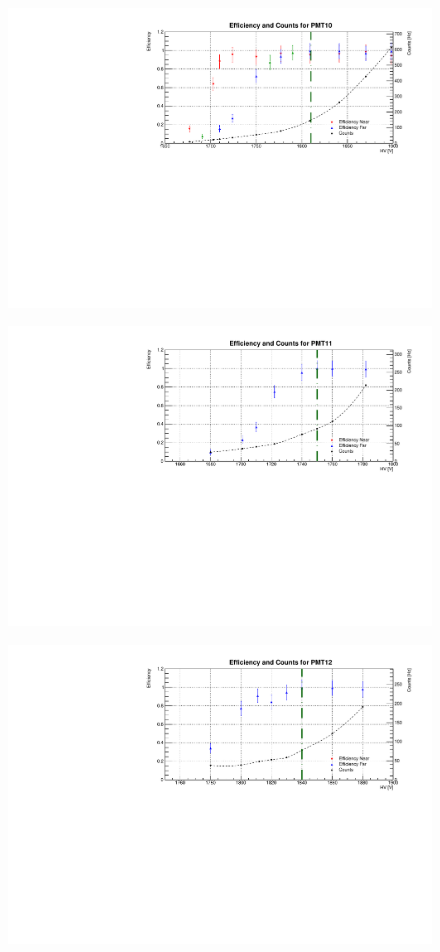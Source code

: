 \begin{figure}[h]
	\centerline{\includegraphics[scale=0.9]{img/eff/eff10.pdf}}
\end{figure}
\begin{figure}[h]
	\centerline{\includegraphics[scale=0.9]{img/eff/eff11.pdf}}
\end{figure}
\begin{figure}[h]
	\centerline{\includegraphics[scale=0.9]{img/eff/eff12.pdf}}
\end{figure}
